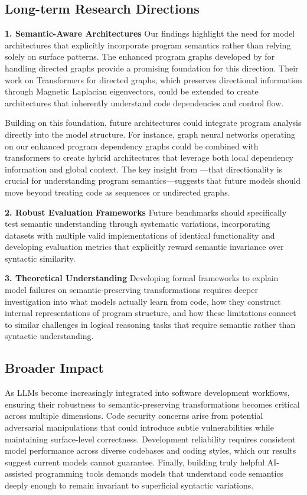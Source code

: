 \documentclass[%
thesis=student,%
coverpage=false,%
titlepage=false,%
headmarks=true, %
english,%
font=libertine, %
math=newpxtx, %
BCOR=5mm,%
coverBCOR=11mm%
]{tum-templates/book/tumbook}
\begin{document}
\subsection{Long-term Research Directions}

\textbf{1. Semantic-Aware Architectures}
Our findings highlight the need for model architectures that explicitly incorporate program semantics rather than relying solely on surface patterns. The enhanced program graphs developed by \textcite{Geisler2023} for handling directed graphs provide a promising foundation for this direction. Their work on Transformers for directed graphs, which preserves directional information through Magnetic Laplacian eigenvectors, could be extended to create architectures that inherently understand code dependencies and control flow. 

Building on this foundation, future architectures could integrate program analysis directly into the model structure. For instance, graph neural networks operating on our enhanced program dependency graphs could be combined with transformers to create hybrid architectures that leverage both local dependency information and global context. The key insight from \textcite{Geisler2023} —that directionality is crucial for understanding program semantics—suggests that future models should move beyond treating code as sequences or undirected graphs.


\textbf{2. Robust Evaluation Frameworks}
Future benchmarks should specifically test semantic understanding through systematic variations, incorporating datasets with multiple valid implementations of identical functionality and developing evaluation metrics that explicitly reward semantic invariance over syntactic similarity.

\textbf{3. Theoretical Understanding}
Developing formal frameworks to explain model failures on semantic-preserving transformations requires deeper investigation into what models actually learn from code, how they construct internal representations of program structure, and how these limitations connect to similar challenges in logical reasoning tasks that require semantic rather than syntactic understanding.

\subsection{Broader Impact}

As LLMs become increasingly integrated into software development workflows, ensuring their robustness to semantic-preserving transformations becomes critical across multiple dimensions. Code security concerns arise from potential adversarial manipulations that could introduce subtle vulnerabilities while maintaining surface-level correctness. Development reliability requires consistent model performance across diverse codebases and coding styles, which our results suggest current models cannot guarantee. Finally, building truly helpful AI-assisted programming tools demands models that understand code semantics deeply enough to remain invariant to superficial syntactic variations.
\end{document}
